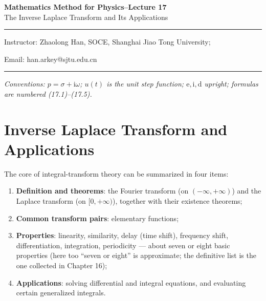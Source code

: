 \documentclass[11pt,a4paper]{article}
\theoremstyle{definition}
\theoremstyle{plain}
\begin{document}
\begin{center}
    {\LARGE \textbf{Mathematics Method for Physics--Lecture 17}} \\[0.6em]
    {\large The Inverse Laplace Transform and Its Applications}
\end{center}

\vspace{-0.5em}
\noindent\rule{\textwidth}{0.5pt}
\vspace{0.3em}

\begin{center}
    Instructor: Zhaolong Han, SOCE, Shanghai Jiao Tong University;
\end{center}

\vspace{-0.6em}
\noindent Email: han.arkey@sjtu.edu.cn

\vspace{0.4em}
\noindent\rule{\textwidth}{0.5pt}

\vspace{0.8em}
\noindent\textit{Conventions: $p=\sigma+\mathrm{i}\omega$; $u(t)$ is the unit step function;
$\mathrm{e},\mathrm{i},\mathrm{d}$ upright; formulas are numbered (17.1)--(17.5).}

\vspace{1.5em}

\setcounter{section}{16}

\section{Inverse Laplace Transform and Applications}

The core of integral-transform theory can be summarized in four items:
\begin{enumerate}\setlength{\itemsep}{2pt}\setlength{\topsep}{3pt}
    \item \textbf{Definition and theorems}: the Fourier transform (on $(-\infty,+\infty)$) and the
          Laplace transform (on $[0,+\infty)$), together with their existence theorems;
    \item \textbf{Common transform pairs}: elementary functions;
    \item \textbf{Properties}: linearity, similarity, delay (time shift), frequency shift,
          differentiation, integration, periodicity --- about seven or eight basic properties
          (here too ``seven or eight'' is approximate; the definitive list is the one collected in
          Chapter 16);
    \item \textbf{Applications}: solving differential and integral equations, and evaluating
          certain generalized integrals.
\end{enumerate}
\end{document}
